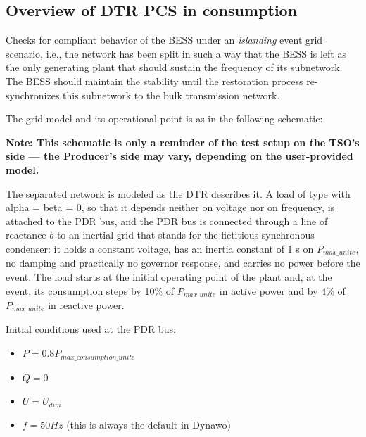     \subsection{Overview of DTR PCS \DTRPcs{} in consumption}

    Checks for compliant behavior of the BESS under an \emph{islanding} event grid
    scenario, i.e., the network has been split in such a way that the BESS is left as
    the only generating plant that should sustain the frequency of its
    subnetwork. The BESS should maintain the stability until the restoration process
    re-synchronizes this subnetwork to the bulk transmission network.

    The grid model and its operational point is as in the following schematic:
    \begin{center}
        
    \end{center}
    \begin{center}
        \small \textbf{Note: This schematic is only a reminder of the test setup on the TSO's
        side --- the Producer's side may vary, depending on the user-provided model.}
    \end{center}

    The separated network is modeled as the DTR describes it. A load of type
     with alpha = beta = 0, so that it depends neither on
    voltage nor on frequency, is attached to the PDR bus, and the PDR bus is
    connected through a line of reactance $b$ to an inertial grid that stands
    for the fictitious synchronous condenser: it holds a constant voltage, has
    an inertia constant of 1 s on $P_{max\_unite}$, no damping and practically
    no governor response, and carries no power before the event. The load
    starts at the initial operating point of the plant and, at the event, its
    consumption steps by 10\% of $P_{max\_unite}$ in active power and by 4\%
    of $P_{max\_unite}$ in reactive power.

    \begin{description}
        \item Initial conditions used at the PDR bus:
        \begin{itemize}
            \item $P = 0.8 P_{max\_consumption\_unite}$
            \item $Q = 0$
            \item $U = U_{dim}$
            \item $f = 50 Hz$ (this is always the default in Dynawo)
        \end{itemize}
    \end{description}

